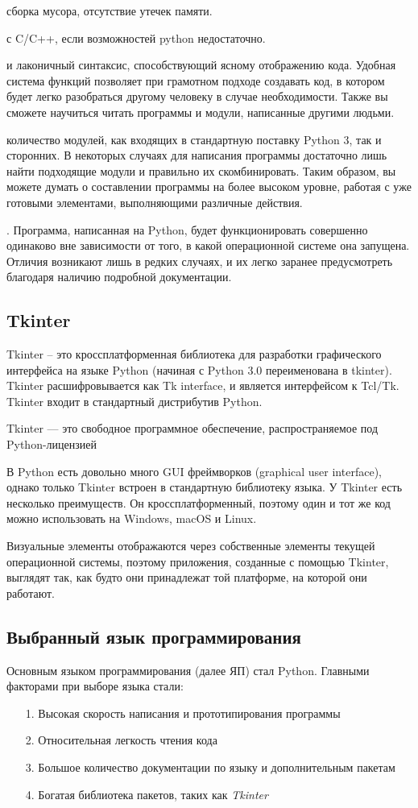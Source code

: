 \documentclass[11pt,a4paper]{report}
\begin{document}
 сборка мусора, отсутствие утечек памяти.

 с C/C++, если возможностей python недостаточно.

 и лаконичный синтаксис, способствующий ясному отображению кода. Удобная система функций позволяет при грамотном подходе создавать код, в котором будет легко разобраться другому человеку в случае необходимости. Также вы сможете научиться читать программы и модули, написанные другими людьми.

 количество модулей, как входящих в стандартную поставку Python 3, так и сторонних. В некоторых случаях для написания программы достаточно лишь найти подходящие модули и правильно их скомбинировать. Таким образом, вы можете думать о составлении программы на более высоком уровне, работая с уже готовыми элементами, выполняющими различные действия.

. Программа, написанная на Python, будет функционировать совершенно одинаково вне зависимости от того, в какой операционной системе она запущена. Отличия возникают лишь в редких случаях, и их легко заранее предусмотреть благодаря наличию подробной документации.
\subsection{Tkinter}
Tkinter – это кроссплатформенная библиотека для разработки графического интерфейса на языке Python (начиная с Python 3.0 переименована в tkinter). Tkinter расшифровывается как Tk interface, и является интерфейсом к Tcl/Tk.
Tkinter входит в стандартный дистрибутив Python.

Tkinter — это свободное программное обеспечение, распространяемое под Python-лицензией

В Python есть довольно много GUI фреймворков (graphical user interface), однако только Tkinter встроен в стандартную библиотеку языка. У Tkinter есть несколько преимуществ. Он кроссплатформенный, поэтому один и тот же код можно использовать на Windows, macOS и Linux.

Визуальные элементы отображаются через собственные элементы текущей операционной системы, поэтому приложения, созданные с помощью Tkinter, выглядят так, как будто они принадлежат той платформе, на которой они работают.

\subsection{Выбранный язык программирования}
Основным языком программирования (далее ЯП) стал Python. Главными факторами при выборе языка стали:
\begin{enumerate}
\item[1.]Высокая скорость написания и прототипирования программы
\item[2.]Относительная легкость чтения кода 
\item[3.]Большое количество документации по языку и дополнительным пакетам
\item[4.]Богатая библиотека пакетов, таких как \textit{Tkinter} 
\end{enumerate} 
\end{document}
